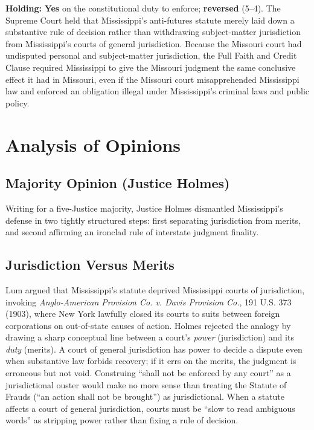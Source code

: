 \documentclass[12pt]{article}
\begin{document}
\textbf{Holding:} \textbf{Yes} on the constitutional duty to enforce; \textbf{reversed} (5--4). The Supreme Court held that Mississippi's anti-futures statute merely laid down a substantive rule of decision rather than withdrawing subject-matter jurisdiction from Mississippi's courts of general jurisdiction. Because the Missouri court had undisputed personal and subject-matter jurisdiction, the Full Faith and Credit Clause required Mississippi to give the Missouri judgment the same conclusive effect it had in Missouri, even if the Missouri court misapprehended Mississippi law and enforced an obligation illegal under Mississippi's criminal laws and public policy.

\section{Analysis of Opinions}
\subsection{Majority Opinion (Justice Holmes)}

Writing for a five-Justice majority, Justice Holmes dismantled Mississippi's defense in two tightly structured steps: first separating jurisdiction from merits, and second affirming an ironclad rule of interstate judgment finality.

\subsection{Jurisdiction Versus Merits}
Lum argued that Mississippi's statute deprived Mississippi courts of jurisdiction, invoking \textit{Anglo-American Provision Co. v. Davis Provision Co.}, 191 U.S. 373 (1903), where New York lawfully closed its courts to suits between foreign corporations on out-of-state causes of action. Holmes rejected the analogy by drawing a sharp conceptual line between a court's \textit{power} (jurisdiction) and its \textit{duty} (merits). A court of general jurisdiction has power to decide a dispute even when substantive law forbids recovery; if it errs on the merits, the judgment is erroneous but not void. Construing ``shall not be enforced by any court'' as a jurisdictional ouster would make no more sense than treating the Statute of Frauds (``an action shall not be brought'') as jurisdictional. When a statute affects a court of general jurisdiction, courts must be ``slow to read ambiguous words'' as stripping power rather than fixing a rule of decision.
\end{document}
